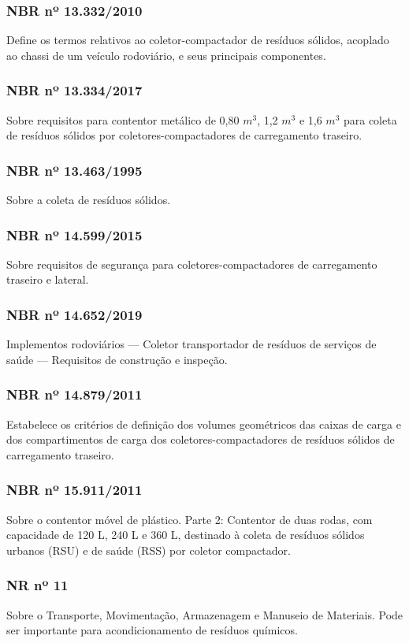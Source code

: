 \begin{subapend}
\begin{subsubapend}
		\subsubsection{NBR nº 13.332/2010}
		Define os termos relativos ao coletor-compactador de resíduos sólidos, acoplado ao chassi de um veículo rodoviário, e seus principais componentes.
		\subsubsection{NBR nº 13.334/2017}
		Sobre requisitos para contentor metálico de 0,80 $m^3$, 1,2 $m^3$ e 1,6 $m^3$ para coleta de resíduos sólidos por coletores-compactadores de carregamento traseiro.
		\subsubsection{NBR nº 13.463/1995}
		Sobre a coleta de resíduos sólidos.
		\subsubsection{NBR nº 14.599/2015}
		Sobre requisitos de segurança para coletores-compactadores de carregamento traseiro e lateral.
		\subsubsection{NBR nº 14.652/2019}
		Implementos rodoviários — Coletor transportador de resíduos de serviços de saúde — Requisitos de construção e inspeção.
		\subsubsection{NBR nº 14.879/2011}
		Estabelece os critérios de definição dos volumes geométricos das caixas de carga e dos compartimentos de carga dos coletores-compactadores de resíduos sólidos de carregamento traseiro.
		\subsubsection{NBR nº 15.911/2011}
		Sobre o contentor móvel de plástico. Parte 2: Contentor de duas rodas, com capacidade de 120 L, 240 L e 360 L, destinado à coleta de resíduos sólidos urbanos (RSU) e de saúde (RSS) por coletor compactador. 
		\subsubsection{NR nº 11}
		Sobre o Transporte, Movimentação, Armazenagem e Manuseio de Materiais. Pode ser importante para acondicionamento de resíduos químicos.

\end{subsubapend}
\end{subapend}
